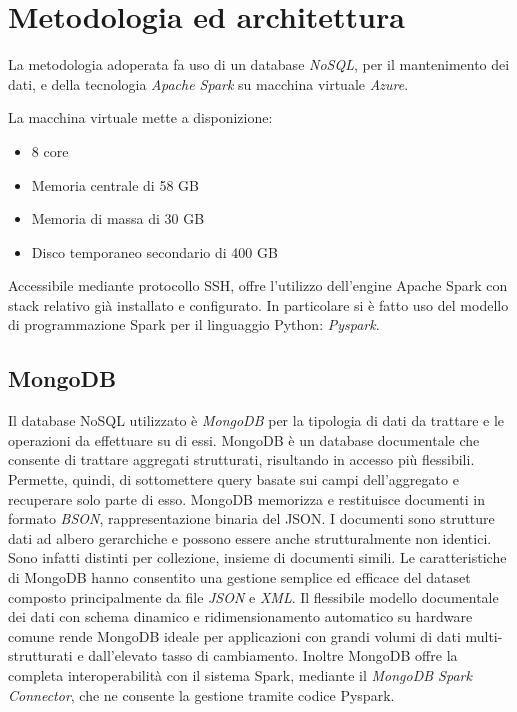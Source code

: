 \chapter{Metodologia ed architettura}
La metodologia adoperata fa uso di un database \emph{NoSQL}, per il mantenimento dei dati, e della tecnologia \emph{Apache Spark} su macchina virtuale \emph{Azure}.\par 
La macchina virtuale mette a disponizione:
\begin{itemize}
	\item 8 core
	\item Memoria centrale di 58 GB
	\item Memoria di massa di 30 GB
	\item Disco temporaneo secondario di 400 GB
\end{itemize}
Accessibile mediante protocollo SSH, offre l'utilizzo dell'engine Apache Spark con stack relativo già installato e configurato. In particolare si è fatto uso del modello di programmazione Spark per il linguaggio Python: \emph{Pyspark}.\par
\section{MongoDB}
Il database NoSQL utilizzato è \emph{MongoDB} per la tipologia di dati da trattare e le operazioni da effettuare su di essi. MongoDB è un database documentale che consente di trattare aggregati strutturati, risultando in accesso più flessibili. Permette, quindi, di sottomettere query basate sui campi dell'aggregato e recuperare solo parte di esso. MongoDB memorizza e restituisce documenti in formato \emph{BSON}, rappresentazione binaria del JSON. I documenti sono strutture dati ad albero gerarchiche e possono essere anche strutturalmente non identici. Sono infatti distinti per collezione, insieme di documenti simili. Le caratteristiche di MongoDB hanno consentito una gestione semplice ed efficace del dataset composto principalmente da file \emph{JSON} e \emph{XML}. Il flessibile modello documentale dei dati con schema dinamico e ridimensionamento automatico su hardware comune rende MongoDB ideale per applicazioni con grandi volumi di dati multi-strutturati e dall'elevato tasso di cambiamento. Inoltre MongoDB offre la completa interoperabilità con il sistema Spark, mediante il \emph{MongoDB Spark Connector}, che ne consente la gestione tramite codice Pyspark.

